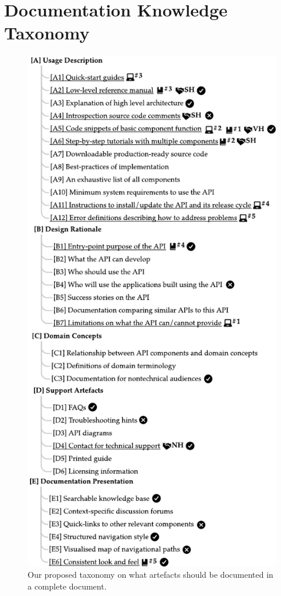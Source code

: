 \section{ Documentation Knowledge Taxonomy}
\label{tse2020:sec:findings}

\begin{figure}[p]
\centering
\includegraphics[width=.85\linewidth]{taxonomy}
\caption[Our proposed API documentation knowledge taxonomy]{Our proposed taxonomy on what artefacts should be documented in a complete  document.} %

\end{figure}
